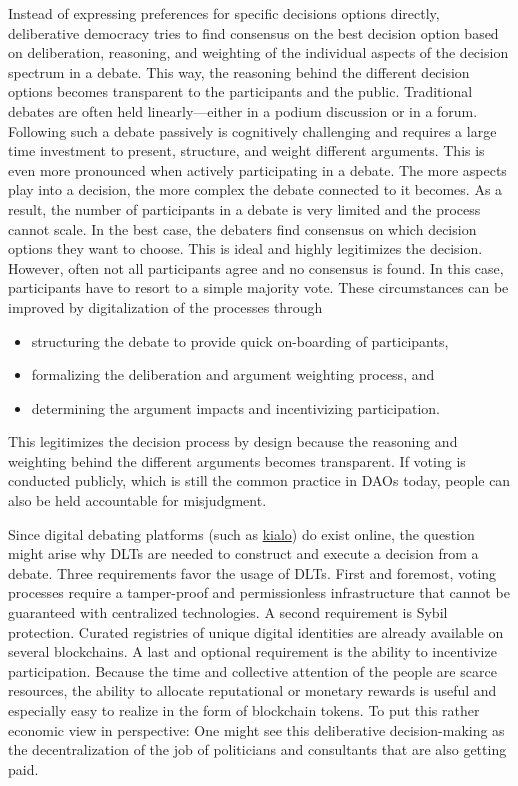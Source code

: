 \documentclass[%
aip,
amsmath,amssymb,
reprint,%
unsortedaddress,
nofootinbib
]{revtex4-2}
\begin{document}
Instead of expressing preferences for specific decisions options directly, 
deliberative democracy tries to find consensus on the best decision option based on deliberation, reasoning, and weighting of the individual aspects of the decision spectrum in a debate.
This way, the reasoning behind the different decision options becomes transparent to the participants and the public.
Traditional debates are often held linearly---either in a podium discussion or in a forum.
Following such a debate passively is cognitively challenging and requires a large time investment
to present, structure, and weight different arguments.
This is even more pronounced when actively participating in a debate.
The more aspects play into a decision, the more complex the debate connected to it becomes.
As a result, the number of participants in a debate is very limited and the process cannot scale.\todo{}
In the best case, the debaters find consensus on which decision options they want to choose.
This is ideal and highly legitimizes the decision.
However, often not all participants agree and no consensus is found.
In this case, participants have to resort to a simple majority vote.
These circumstances can be improved by digitalization of the processes through
\begin{itemize}[noitemsep]
	\item structuring the debate to provide quick on-boarding of participants,
	\item formalizing the deliberation and argument weighting process, and
	\item determining the argument impacts and incentivizing participation. 
\end{itemize}

This legitimizes the decision process by design because the reasoning and weighting behind the different arguments becomes transparent.
If voting is conducted publicly, which is still the common practice in \acp{DAO} today, 
people can also be held accountable for misjudgment.

Since digital debating platforms (such as \href{https://www.kialo.com/}{kialo}) do exist online,
the question might arise why \acp{DLT} are needed to construct and execute a decision from a debate.
%
Three requirements favor the usage of \acp{DLT}.
First and foremost, voting processes require a tamper-proof and permissionless infrastructure that cannot be guaranteed with centralized technologies.
A second requirement is Sybil protection. 
Curated registries of unique digital identities are already available on several blockchains. 
A last and optional requirement is the ability to incentivize participation.
Because the time and collective attention of the people are scarce resources,
the ability to allocate reputational or monetary rewards is useful
and especially easy to realize in the form of blockchain tokens.
To put this rather economic view in perspective:
One might see this deliberative decision-making as the decentralization of the job of politicians and consultants that are also getting paid.
\end{document}
